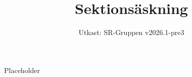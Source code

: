 \documentclass[a4paper]{dtek}
\title{Sektionsäskning}
\date{Utkast: SR-Gruppen v2026.1-pre3}
\begin{document}
Placeholder
\end{document}
